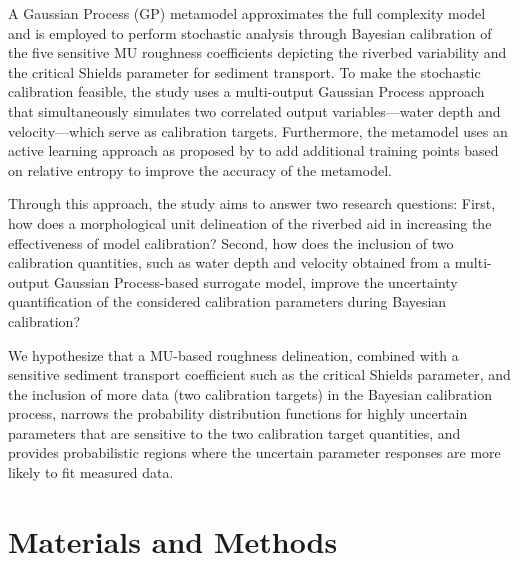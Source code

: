 \documentclass[draft,linenumbers,onecolumn]{agujournal2019} %
\begin{document}
A Gaussian Process (GP) metamodel approximates the full complexity model and is employed to perform stochastic analysis through Bayesian calibration of the five sensitive MU roughness coefficients depicting the riverbed variability and the critical Shields parameter for sediment transport. To make the stochastic calibration feasible, the study uses a multi-output Gaussian Process approach that simultaneously simulates two correlated output variables—water depth and velocity—which serve as calibration targets. Furthermore, the metamodel uses an active learning approach as proposed by \cite{oladyshkin2020bayesian3} to add additional training points based on relative entropy to improve the accuracy of the metamodel. 

Through this approach, the study aims to answer two research questions: First, how does a morphological unit delineation of the riverbed aid in increasing the effectiveness of model calibration? Second, how does the inclusion of two calibration quantities, such as water depth and velocity obtained from a multi-output Gaussian Process-based surrogate model, improve the uncertainty quantification of the considered calibration parameters during Bayesian calibration?

We hypothesize that a MU-based roughness delineation, combined with a sensitive sediment transport coefficient such as the critical Shields parameter, and the inclusion of more data (two calibration targets) in the Bayesian calibration process, narrows the probability distribution functions for highly uncertain parameters that are sensitive to the two calibration target quantities, and provides probabilistic regions where the uncertain parameter responses are more likely to fit measured data.  


\section{Materials and Methods} 
\label{Materials}
\cite{haag2001erosion}
\end{document}

